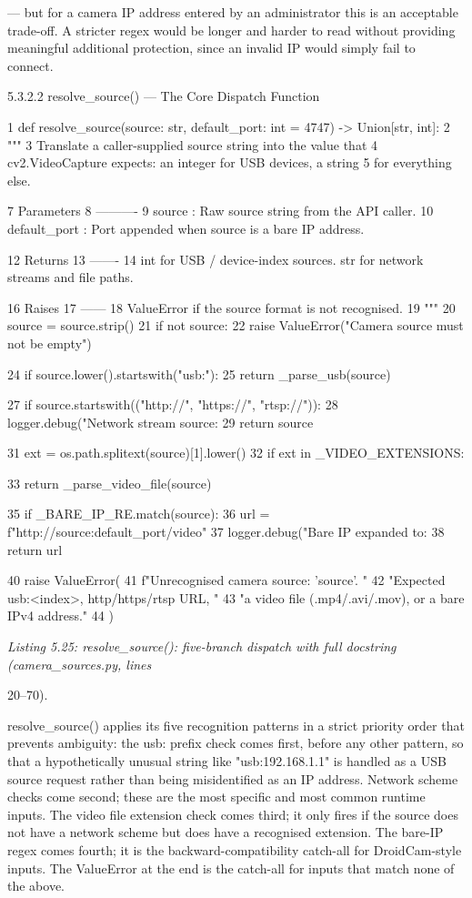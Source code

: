 --- but for a camera IP address entered by an administrator this is an acceptable trade-off. A
stricter regex would be longer and harder to read without providing meaningful additional
protection, since an invalid IP would simply fail to connect.



5.3.2.2 resolve\_source() --- The Core Dispatch Function

1 def resolve\_source(source: str, default\_port: int = 4747) -> Union[str, int]:
2 """
3 Translate a caller-supplied source string into the value that
4 cv2.VideoCapture expects: an integer for USB devices, a string
5 for everything else.

7 Parameters
8 ----------
9 source : Raw source string from the API caller.
10 default\_port : Port appended when source is a bare IP address.

12 Returns
13 -------
14 int for USB / device-index sources. str for network streams and file paths.

16 Raises
17 ------
18 ValueError if the source format is not recognised.
19 """
20 source = source.strip()
21 if not source:
22 raise ValueError("Camera source must not be empty")

24 if source.lower().startswith("usb:"):
25 return \_parse\_usb(source)


27 if source.startswith(("http://", "https://", "rtsp://")):
28 logger.debug("Network stream source: %
29 return source


31 ext = os.path.splitext(source)[1].lower()
32 if ext in \_VIDEO\_EXTENSIONS:




33 return \_parse\_video\_file(source)

35 if \_BARE\_IP\_RE.match(source):
36 url = f"http://{source}:{default\_port}/video"
37 logger.debug("Bare IP expanded to: %
38 return url


40 raise ValueError(
41 f"Unrecognised camera source: '{source}'. "
42 "Expected usb:<index>, http/https/rtsp URL, "
43 "a video file (.mp4/.avi/.mov), or a bare IPv4 address."
44 )


\textit{Listing 5.25: resolve\_source(): ﬁve-branch dispatch with full docstring (camera\_sources.py, lines}

20--70).


resolve\_source() applies its ﬁve recognition patterns in a strict priority order that
prevents ambiguity: the usb: preﬁx check comes ﬁrst, before any other pattern, so that a
hypothetically unusual string like "usb:192.168.1.1" is handled as a USB source request
rather than being misidentiﬁed as an IP address. Network scheme checks come second;
these are the most speciﬁc and most common runtime inputs. The video ﬁle extension
check comes third; it only ﬁres if the source does not have a network scheme but does have
a recognised extension. The bare-IP regex comes fourth; it is the backward-compatibility
catch-all for DroidCam-style inputs. The ValueError at the end is the catch-all for inputs
that match none of the above.

